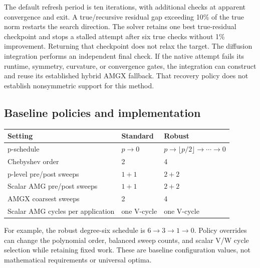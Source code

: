 \documentclass[11pt]{article}
\numberwithin{equation}{section}
\numberwithin{figure}{section}
\numberwithin{table}{section}
\begin{document}
The default refresh period is ten iterations, with additional checks at
apparent convergence and exit. A true/recursive residual gap exceeding 10\%
of the true norm restarts the search direction. The solver retains one best
true-residual checkpoint and stops a stalled attempt after six true checks
without 1\% improvement. Returning that checkpoint does not relax the target.
The diffusion integration performs an independent final check. If the native
attempt fails its runtime, symmetry, curvature, or convergence gates, the
integration can construct and reuse its established hybrid AMGX fallback.
That recovery policy does not establish nonsymmetric support for this method.

\subsection{Baseline policies and implementation}
\begin{center}
\begin{tabular}{lll}
\toprule
Setting & Standard & Robust\\
\midrule
p-schedule & $p\to0$ & $p\to\lfloor p/2\rfloor\to\cdots\to0$\\
Chebyshev order & 2 & 4\\
p-level pre/post sweeps & $1+1$ & $2+2$\\
Scalar AMG pre/post sweeps & $1+1$ & $2+2$\\
AMGX coarsest sweeps & 2 & 4\\
Scalar AMG cycles per application & one V-cycle & one V-cycle\\
\bottomrule
\end{tabular}
\end{center}
For example, the robust degree-six schedule is $6\to3\to1\to0$.
Policy overrides can change the polynomial order, balanced sweep counts, and
scalar V/W cycle selection while retaining fixed work. These are baseline
configuration values, not mathematical requirements or universal optima.
\end{document}
